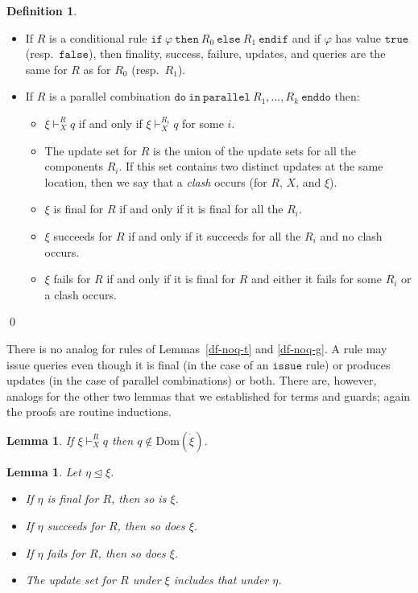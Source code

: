 \documentclass{LMCS}
\newtheorem{la}[thm]{Lemma}
\theoremstyle{definition}
\newtheorem{df}[thm]{Definition}
\newenvironment{ls}{\begin{itemize}}{\end{itemize}}
\newcommand{\ans}{\dot}
\newcommand{\dom}[1]{\ensuremath{{\text{Dom}}(#1)}}
\newcommand{\initeq}{\unlhd}
\newcommand{\ttt}[1]{\ensuremath{\mathtt {#1}}}
\renewcommand{\phi}{\varphi}
\begin{document}
\begin{df}
\begin{ls}
     \item If $R$ is a conditional rule $\ttt{if\ } \phi
\ttt{\ then\ } R_0 \ttt{\ else\ } R_1 \ttt{\ endif}$ and if $\phi$ has
value \ttt{true} (resp.\ \ttt{false}), then finality, success, failure,
updates, and queries are the same for $R$ as for $R_0$ (resp.\ $R_1$).
     \item If $R$ is a parallel combination $\ttt{do\ in\ parallel\
     }R_1,\dots,R_k\ttt{\ enddo}$ then:
       \begin{ls}
     \item $\xi\vdash^R_Xq$ if and only if $\xi\vdash^{R_i}_Xq$
     for some $i$.
     \item The update set for $R$ is the union of the update sets
     for all the components $R_i$.  If this set contains two
     distinct updates at the same location, then we say that a
     \emph {clash} occurs (for $R$, $X$, and $\xi$).
     \item $\xi$ is final for $R$ if and only if it is final for
     all the $R_i$.
     \item $\xi$ succeeds for $R$ if and only if it succeeds for
         all the $R_i$ and no clash occurs.
     \item $\xi$ fails for $R$ if and only if it is final for $R$
     and either it fails for some $R_i$ or a clash occurs.
       \end{ls}
  \end{ls}
\qed\end{df}

There is no analog for rules of Lemmas~\ref{df-noq-t} and
\ref{df-noq-g}.  A rule may issue queries even though it is final
(in the case of an \ttt{issue} rule) or produces updates (in the
case of parallel combinations) or both.  There are, however, analogs
for the other two lemmas that we established for terms and guards;
again the proofs are routine inductions.

\begin{la}   \label{no-rep-r}
If $\xi\vdash^R_Xq$ then $q\notin\dom{\ans\xi}$.
\end{la}

\begin{la}   \label{mon-r}
Let $\eta\initeq\xi$.
\begin{ls}
  \item If $\eta$ is final for $R$, then so is $\xi$.
  \item If $\eta$ succeeds for $R$, then so does $\xi$.
  \item If $\eta$ fails for $R$, then so does $\xi$.
  \item The update set for $R$ under $\xi$ includes that under
  $\eta$.
\end{ls}
\end{la}
\end{document}
